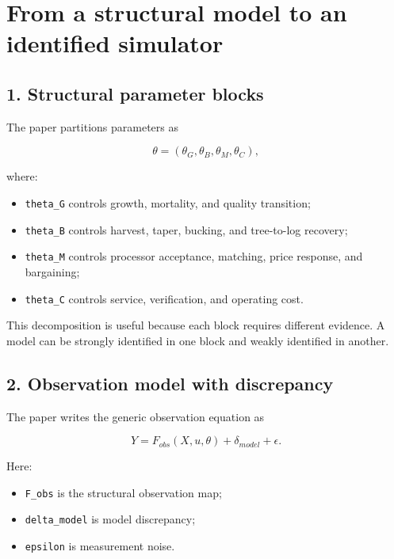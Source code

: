 \section{From a structural model to an identified simulator}\label{from-a-structural-model-to-an-identified-simulator}

\subsection{1. Structural parameter blocks}\label{structural-parameter-blocks}

The paper partitions parameters as

\[
\theta=(\theta_G,\theta_B,\theta_M,\theta_C),
\]

where:

\begin{itemize}
\tightlist
\item
  \texttt{theta\_G} controls growth, mortality, and quality transition;
\item
  \texttt{theta\_B} controls harvest, taper, bucking, and tree-to-log recovery;
\item
  \texttt{theta\_M} controls processor acceptance, matching, price response, and
  bargaining;
\item
  \texttt{theta\_C} controls service, verification, and operating cost.
\end{itemize}

This decomposition is useful because each block requires different evidence.
A model can be strongly identified in one block and weakly identified in
another.

\subsection{2. Observation model with discrepancy}\label{observation-model-with-discrepancy}

The paper writes the generic observation equation as

\[
Y=F_{obs}(X,u,\theta)+\delta_{model}+\epsilon.
\]

Here:

\begin{itemize}
\tightlist
\item
  \texttt{F\_obs} is the structural observation map;
\item
  \texttt{delta\_model} is model discrepancy;
\item
  \texttt{epsilon} is measurement noise.
\end{itemize}

